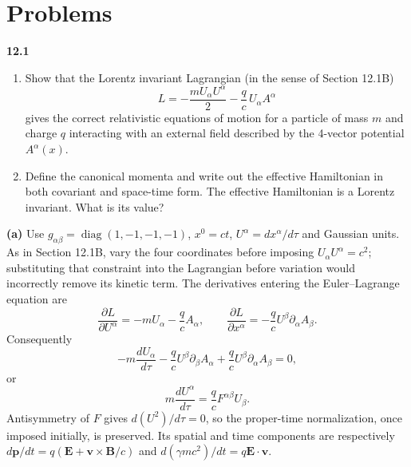 
\section*{Problems}

\par\bigskip
\noindent\textbf{12.1}\quad\begin{enumerate}
\item[(a)] Show that the Lorentz invariant Lagrangian (in the sense of Section 12.1B)
\[
L=-\frac{mU_{\alpha}U^{\alpha}}{2}-\frac{q}{c}\,U_{\alpha}A^{\alpha}
\]
gives the correct relativistic equations of motion for a particle of mass $m$ and charge $q$ interacting with an external field described by the 4-vector potential $A^{\alpha}(x)$.
\item[(b)] Define the canonical momenta and write out the effective Hamiltonian in both covariant and space-time form. The effective Hamiltonian is a Lorentz invariant. What is its value?
\end{enumerate}
\solution

\medskip\noindent\textbf{(a)} Use $g_{\alpha\beta}=\operatorname{diag}(1,-1,-1,-1)$,
$x^0=ct$, $U^\alpha=dx^\alpha/d\tau$ and Gaussian units.
As in Section 12.1B, vary the four coordinates before imposing
$U_\alpha U^\alpha=c^2$; substituting that constraint into the
Lagrangian before variation would incorrectly remove its kinetic term.
The derivatives entering the Euler--Lagrange equation are
\[
\frac{\partial L}{\partial U^\alpha}=-mU_\alpha-\frac qc A_\alpha,
\qquad
\frac{\partial L}{\partial x^\alpha}
=-\frac qc U^\beta\partial_\alpha A_\beta.
\]
Consequently
\[
-m\frac{dU_\alpha}{d\tau}
-\frac qc U^\beta\partial_\beta A_\alpha
+\frac qc U^\beta\partial_\alpha A_\beta=0,
\]
or
\[
\boxed{m\frac{dU^\alpha}{d\tau}
 =\frac qc F^{\alpha\beta}U_\beta.}
\]
Antisymmetry of $F$ gives $d(U^2)/d\tau=0$, so the proper-time
normalization, once imposed initially, is preserved.  Its spatial
and time components are respectively
$d\mathbf p/dt=q(\mathbf E+\mathbf v\times\mathbf B/c)$ and
$d(\gamma mc^2)/dt=q\mathbf E\cdot\mathbf v$.

